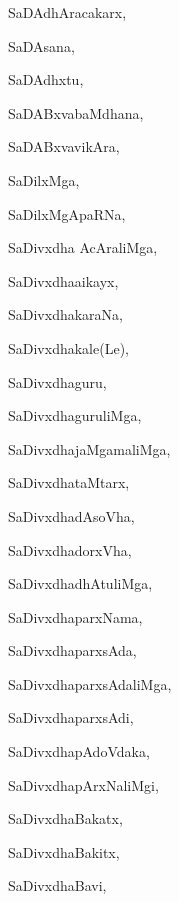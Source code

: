 \begin{multicols}{3}
{\noindent
{SaDAdhAracakarx}, \pageref{SaDAdhAracakarx}

\noindent
{SaDAsana}, \pageref{SaDAsana}

\noindent
{SaDAdhxtu}, \pageref{SaDAdhxtu}

\noindent
{SaDABxvabaMdhana}, \pageref{SaDABxvabaMdhana}

\noindent
{SaDABxvavikAra}, \pageref{SaDABxvavikAra}

\noindent
{SaDilxMga}, \pageref{SaDilxMga}

\noindent
{SaDilxMgApaRNa}, \pageref{SaDilxMgApaRNa}

\noindent
{SaDivxdha AcAraliMga}, \pageref{SaDivxdhaAcAraliMga}

\noindent
{SaDivxdha{ai}kayx}, 

\noindent
{SaDivxdhakaraNa}, \pageref{SaDivxdhakaraNa}

\noindent
{SaDivxdhakale(Le)}, \pageref{SaDivxdhakaleLe}

\noindent
{SaDivxdhaguru}, \pageref{SaDivxdhaguru}

\noindent
{SaDivxdhaguruliMga}, \pageref{SaDivxdhaguruliMga}

\noindent
{SaDivxdhajaMgamaliMga}, \pageref{SaDivxdhajaMgamaliMga}

\noindent
{SaDivxdhataMtarx}, \pageref{SaDivxdhataMtarx}

\noindent
{SaDivxdhadAsoVha}, \pageref{SaDivxdhadAsoVha}

\noindent
{SaDivxdhadorxVha}, \pageref{SaDivxdhadorxVha}

\noindent
{SaDivxdhadhAtuliMga}, \pageref{SaDivxdhadhAtuliMga}

\noindent
{SaDivxdhaparxNama}, \pageref{SaDivxdhaparxNama}

\noindent
{SaDivxdhaparxsAda}, \pageref{SaDivxdhaparxsAda}

\noindent
{SaDivxdhaparxsAdaliMga}, \pageref{SaDivxdhaparxsAdaliMga}

\noindent
{SaDivxdhaparxsAdi}, \pageref{SaDivxdhaparxsAdi}

\noindent
{SaDivxdhapAdoVdaka}, \pageref{SaDivxdhapAdoVdaka}

\noindent
{SaDivxdhapArxNaliMgi}, \pageref{SaDivxdhapArxNaliMgi}

\noindent
{SaDivxdhaBakatx}, \pageref{SaDivxdhaBakatx}

\noindent
{SaDivxdhaBakitx}, \pageref{SaDivxdhaBakitx}

\noindent
{SaDivxdhaBavi}, \pageref{SaDivxdhaBavi}

}
\end{multicols}
